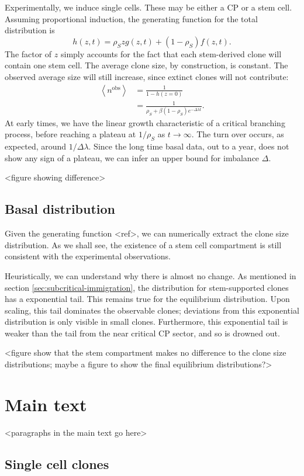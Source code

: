 \documentclass[10pt,UKenglish]{article}
\begin{document}
Experimentally, we induce single cells. These may be either a CP or a stem cell. Assuming proportional induction, the generating function for the total distribution is $$h(z,t) = \rho_S z g(z,t) + (1-\rho_S) f(z,t).$$ The factor of $z$ simply accounts for the fact that each stem-derived clone will contain one stem cell. The average clone size, by construction, is constant. The observed average size will still increase, since extinct clones will not contribute: 
\begin{align*}
\left\langle n^\textrm{obs} \right\rangle &= \frac{1}{1 - h(z=0)} \\
  &= \frac{1}{\rho_S + \beta (1-\rho_S) e^{-\Delta \lambda t}}.
\end{align*}
At early times, we have the linear growth characteristic of a critical branching process, before reaching a plateau at $1/\rho_S$ as $t\rightarrow\infty$. The turn over occurs, as expected, around $1/\Delta\lambda$. Since the long time basal data, out to a year, does not show any sign of a plateau, we can infer an upper bound for imbalance $\Delta$.

<figure showing difference>

\subsection{Basal distribution}

Given the generating function <ref>, we can numerically extract the clone size distribution. As we shall see, the existence of a stem cell compartment is still consistent with the experimental observations.

Heuristically, we can understand why there is almost no change. As mentioned in section \ref{sec:subcritical-immigration}, the distribution for stem-supported clones has a exponential tail. This remains true for the equilibrium distribution. Upon scaling, this tail dominates the observable clones; deviations from this exponential distribution is only visible in small clones. Furthermore, this exponential tail is weaker than the tail from the near critical CP sector, and so is drowned out.

<figure show that the stem compartment makes no difference to the clone size distributions; maybe a figure to show the final equilibrium distributions?>

\section{Main text}

<paragraphs in the main text go here>

\subsection{Single cell clones}
\end{document}
